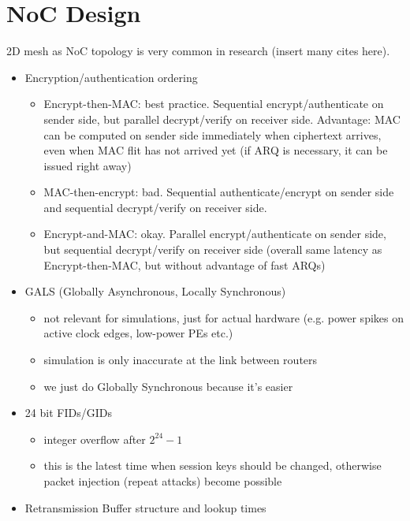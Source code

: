 \documentclass[
	paper=a4,
	fontsize=11pt,
	parskip=full %
]{scrreprt}
\begin{document}
    \chapter{NoC Design}
    2D mesh as NoC topology is very common in research (insert many cites here).
    \begin{itemize}
        \item Encryption/authentication ordering
            \begin{itemize}
                \item Encrypt-then-MAC: best practice. Sequential encrypt/authenticate on sender side, but parallel decrypt/verify
                    on receiver side. Advantage: MAC can be computed on sender side immediately when ciphertext arrives, even when
                    MAC flit has not arrived yet (if ARQ is necessary, it can be issued right away)
                \item MAC-then-encrypt: bad. Sequential authenticate/encrypt on sender side and sequential decrypt/verify on receiver
                    side.
                \item Encrypt-and-MAC: okay. Parallel encrypt/authenticate on sender side, but sequential decrypt/verify on receiver
                    side (overall same latency as Encrypt-then-MAC, but without advantage of fast ARQs)
            \end{itemize}
        \item GALS (Globally Asynchronous, Locally Synchronous)
            \begin{itemize}
                \item not relevant for simulations, just for actual hardware (e.g. power spikes on active clock edges, low-power PEs etc.)
                \item simulation is only inaccurate at the link between routers
                \item we just do Globally Synchronous because it's easier
            \end{itemize}
        \item 24 bit FIDs/GIDs
            \begin{itemize}
                \item integer overflow after $2^{24}-1$
                \item this is the latest time when session keys should be changed, otherwise packet injection (repeat attacks) become
                    possible
            \end{itemize}
        \item Retransmission Buffer structure and lookup times

\end{itemize}
\end{document}
